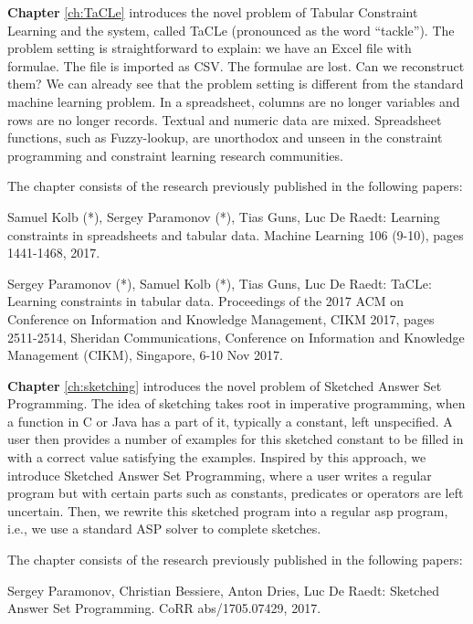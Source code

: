 \textbf{Chapter} \ref{ch:TaCLe} introduces  the novel problem of
Tabular Constraint Learning and the system, called TaCLe (pronounced
as the word ``tackle''). The problem setting is straightforward to
explain: we have an Excel file with formulae. The file is imported as
CSV. The formulae are lost. Can we reconstruct them? We can already 
see that the problem setting is different from the standard machine
learning problem. In a spreadsheet, columns are no longer variables
and rows are no longer records. Textual and numeric data are mixed.
Spreadsheet functions, such as Fuzzy-lookup, are unorthodox and unseen in
the constraint programming and constraint learning research communities.

The chapter consists of the research previously published in the following papers:

\begin{addmargin}[2em]{2em}
Samuel Kolb (*), Sergey Paramonov (*), Tias Guns, Luc De Raedt:
  Learning constraints in spreadsheets and tabular data. Machine
  Learning 106 (9-10), pages 1441-1468, 2017.


Sergey Paramonov (*), Samuel Kolb (*), Tias Guns, Luc De Raedt:
TaCLe: Learning constraints in tabular data. 
 Proceedings of the 2017 ACM on Conference on Information and
    Knowledge Management, CIKM 2017, pages 2511-2514, Sheridan
    Communications, Conference on Information and Knowledge Management
    (CIKM), Singapore, 6-10 Nov 2017.
\end{addmargin}


\textbf{Chapter} \ref{ch:sketching} introduces the novel problem of
Sketched Answer Set Programming. The idea of sketching takes root in
imperative programming, when a function in C or Java has a part of it,
typically a constant, left unspecified. A user then provides a number
of examples for this sketched constant to be filled in with a
correct value satisfying the examples. Inspired by this approach, we
introduce Sketched Answer Set Programming, where a user writes a
regular program but with certain parts such as constants, predicates
or operators are left uncertain. Then, we rewrite this sketched
program into a regular \acrlong{asp} program, i.e., we use a standard ASP solver
to complete sketches.


The chapter consists of the research previously published in the following papers:
\begin{addmargin}[2em]{2em}
  Sergey Paramonov, Christian Bessiere, Anton Dries, Luc De Raedt:
  Sketched Answer Set Programming. CoRR abs/1705.07429, 2017.
\end{addmargin}


